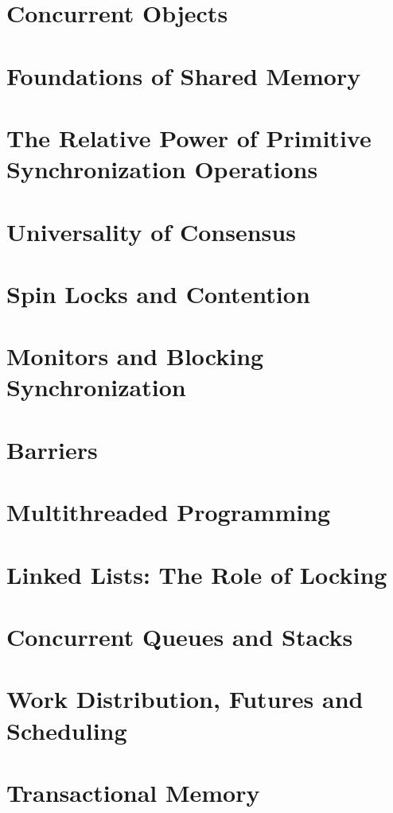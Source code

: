 \documentclass{article}
\begin{document}
%
%
\section{Concurrent Objects}

\section{Foundations of Shared Memory}

\section{The Relative Power of Primitive Synchronization Operations}

\section{Universality of Consensus}

\section{Spin Locks and Contention}

\section{Monitors and Blocking Synchronization}

\section{Barriers}

\section{Multithreaded Programming}

\section{Linked Lists: The Role of Locking}

\section{Concurrent Queues and Stacks}

\section{Work Distribution, Futures and Scheduling}

\section{Transactional Memory}
\end{document}

